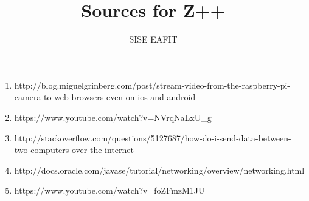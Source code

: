 \documentclass{article}
\begin{document}
\title{Sources for Z++}
\author{SISE EAFIT} 

\maketitle

\begin{enumerate}
    \item http://blog.miguelgrinberg.com/post/stream-video-from-the-raspberry-pi-camera-to-web-browsers-even-on-ios-and-android

    \item https://www.youtube.com/watch?v=NVrqNaLxU\_g

    \item http://stackoverflow.com/questions/5127687/how-do-i-send-data-between-two-computers-over-the-internet

    \item http://docs.oracle.com/javase/tutorial/networking/overview/networking.html

    \item https://www.youtube.com/watch?v=foZFmzM1JU

\end{enumerate}
\end{document}
